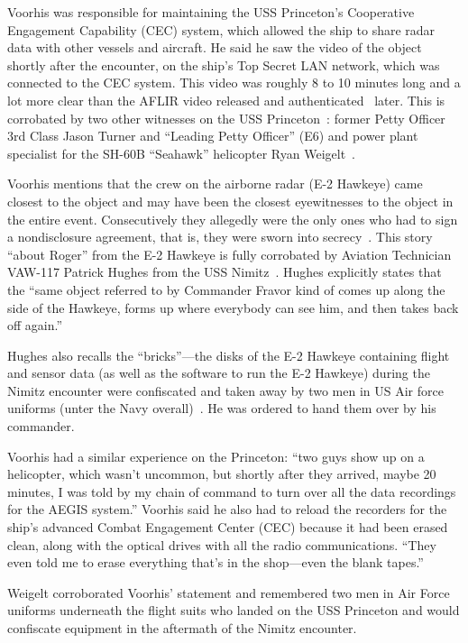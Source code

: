 Voorhis was responsible for maintaining the USS Princeton's Cooperative Engagement Capability (CEC) system,
which allowed the ship to share radar data with other vessels and aircraft.
He said he saw the video of the object shortly after the encounter, on the ship's Top Secret LAN network, which was connected to the CEC system.
This video  was roughly 8 to 10 minutes long and a lot more clear than the AFLIR video released and authenticated~\cite{NAVAIRFOIAFLIR2020Apr} later.
This is corrobated by two other witnesses on the USS Princeton~\cite{PMWitnesses2021Mar}:  former Petty Officer 3rd Class Jason Turner
and ``Leading Petty Officer'' (E6) and power plant specialist for the SH-60B ``Seahawk'' helicopter Ryan Weigelt~\cite{EncountersWeigelt2019Oct}.


Voorhis mentions that the crew on the airborne radar (E-2 Hawkeye) came closest to the object and may have been
the closest eyewitnesses to the object in the entire event.
Consecutively  they allegedly were the only ones who had to
sign a nondisclosure agreement, that is, they were sworn into secrecy~\cite{WestVoorhis2020Jan}.
This story ``about Roger'' from the E-2 Hawkeye is fully corrobated by Aviation Technician  VAW-117 Patrick Hughes from the USS Nimitz~\cite{EncountersHughes2019Sep}.
Hughes explicitly states that the ``same object referred to by Commander Fravor kind of comes up along the side of the Hawkeye,
forms up where everybody can see him, and then takes back off again.''


Hughes also recalls the ``bricks''---the disks of the E-2 Hawkeye  containing flight and sensor  data (as well as the software to run the E-2 Hawkeye)
during the Nimitz encounter
were confiscated and taken away by two men in US Air force uniforms (unter the Navy overall)~\cite{EncountersHughes2019Sep}.
He was ordered to hand them over by his commander.

Voorhis had a similar experience on the Princeton:
``two guys show up on a helicopter, which wasn't uncommon, but shortly after they arrived, maybe 20 minutes,
I was told by my chain of command to turn over all the data recordings for the AEGIS system.''
Voorhis said he also had to reload the recorders for the ship's advanced Combat Engagement Center (CEC)
because it  had been erased clean,
 along with the optical drives with all the radio communications.
``They even told me to erase everything that's in the shop---even the blank tapes.''

Weigelt corroborated Voorhis' statement and remembered two men in Air Force uniforms underneath the flight suits who landed on the USS Princeton
and would confiscate equipment in the aftermath of the Nimitz encounter.


